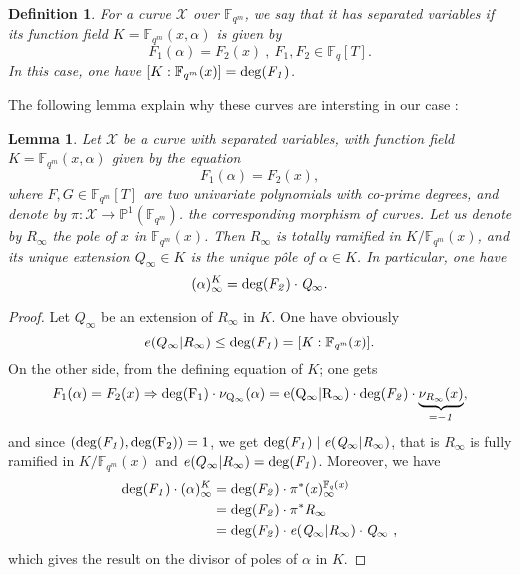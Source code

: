 \documentclass[10pt]{article}
\newtheorem{def1}{Definition}[]
\newtheorem{lem1}{Lemma}[]
\newcommand{\s}{\vspace{0.3cm}}
\newcommand{\cd}{\cdot}
\newcommand{\fqm}{\mathbb{F}_{q^m}}
\newcommand{\fq}{\mathbb{F}_q}
\newcommand{\X}{\mathcal{X}}
\begin{document}
\s

\begin{def1} \label{courbes à variables séparées}
For a curve $\X$ over $\fqm$, we say that it has separated variables if its function field $K=\fqm(x,\alpha)$ is given by
\[F_1(\alpha) = F_2(x) \ , \ F_1,F_2 \in \fq[T].\]
In this case, one have $[K:\fqm(x)] = \rm{deg}(\it{F_1})$.
\end{def1}

\s

The following lemma explain why these curves are intersting in our case :

\s

\begin{lem1} \label{lemdegré}
Let $\X$ be a curve with separated variables, with function field $K=\fqm(x,\alpha)$ given by the equation
\[F_1(\alpha) = F_2(x),\]
where $F,G \in \fqm[T]$ are two univariate polynomials with co-prime degrees, and denote by $\pi : \X \rightarrow \mathbb{P}^1(\fqm)$. the corresponding morphism of curves. Let us denote by $R_{\infty}$ the pole of $x$ in $\fqm(x)$. Then $R_{\infty}$ is totally ramified in $K/\fqm(x)$, and its unique extension $Q_{\infty} \in K$ is the unique pôle of $\alpha \in K$. In particular, one have 
\[(\alpha)^K_{\infty} = \rm{deg}\it{(F_2) \cd Q_{\infty}}.\]
\end{lem1}

\s

\begin{proof}
Let $Q_{\infty}$ be an extension of $R_{\infty}$ in $K$. One have obviously
\[e(Q_{\infty}|R_{\infty}) \leq \rm{deg}\it(F_1)=[K:\fqm(x)].\]
On the other side, from the defining equation of $K$; one gets
\[F_1(\alpha) = F_2(x) \Rightarrow \rm{deg}(F_1) \cd \nu_{Q_{\infty}}(\alpha) = e(Q_{\infty}|R_{\infty}) \cd \rm{deg}\it(F_2) \cd \underbrace{\nu_{R_{\infty}}(x)}_{=-1},\]
and since $(\rm{deg}\it(F_1),\rm{deg}(F_2))=1$, we get $\rm{deg}\it(F_1) \mid e(Q_{\infty}|R_{\infty})$, that is $R_{\infty}$ is fully ramified in $K/\fqm(x)$ and $e(Q_{\infty}|R_{\infty})=\rm{deg}\it(F_1)$. Moreover, we have 
\begin{align*}
\rm{deg}\it(F_1) \cd (\alpha)^K_{\infty} &= \rm{deg}\it(F_2) \cd \pi^*(x)^{\fq(x)}_{\infty} \\
&= \rm{deg}\it(F_2) \cd \pi^* R_{\infty} \\
&= \rm{deg}\it(F_2) \cd e(Q_{\infty}|R_{\infty}) \cd Q_{\infty} \ ,
\end{align*}
which gives the result on the divisor of poles of $\alpha$ in $K$.
\end{proof}
\end{document}
